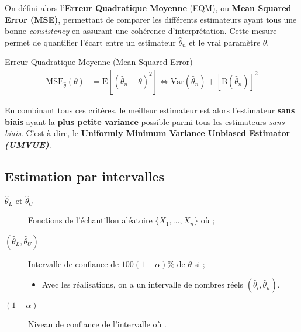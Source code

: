 \documentclass[10pt, french]{article}
\begin{document}
\begin{multicols*}{2}
On défini alors l'\textbf{Erreur Quadratique Moyenne} (EQM), ou \textbf{Mean Squared Error (MSE)}, permettant de comparer les différents estimateurs ayant tous une bonne \textit{consistency} en assurant une cohérence d'interprétation. Cette mesure permet de quantifier l'écart entre un estimateur $\hat{\theta}_{n}$ et le vrai paramètre $\theta$.

\begin{algo}{Erreur Quadratique Moyenne (Mean Squared Error)}
\begin{align*}
	\text{MSE}_{\hat\theta}(\theta)
	&=	\text{E}[(\hat{\theta}_{n} - \theta)^{2}]
	\Leftrightarrow	\text{Var}(\hat{\theta}_{n}) + \left[\text{B}(\hat{\theta}_{n})\right]^{2}
\end{align*}
\end{algo}

En combinant tous ces critères, le meilleur estimateur est alors l'estimateur \textbf{sans biais} ayant la \textbf{plus petite variance} possible parmi tous les estimateurs \textit{sans biais}. C'est-à-dire, le \textbf{Uniformly Minimum Variance Unbiased Estimator \textit{(UMVUE)}}.

\columnbreak

\subsection{Estimation par intervalles}

\begin{distributions}[Notation]
\begin{description}
	\item[$\hat{\theta}_{L}$ et $\hat{\theta}_{U}$]	Fonctions de l'échantillon aléatoire $\{X_{1}, \dots, X_{n}\}$ où ;
	\item[$(\hat{\theta}_{L}, \hat{\theta}_{U})$]	Intervalle de confiance de $100(1 - \alpha)\%$ de $\theta$ si ;
		\begin{itemize}
		\item	Avec les réalisations, on a un intervalle de nombres réels $(\hat{\theta}_{l}, \hat{\theta}_{u})$.
		\end{itemize}
	\item[$(1 - \alpha)$]	Niveau de confiance de l'intervalle où .
\end{description}
\end{distributions}


\end{multicols*}
\end{document}
